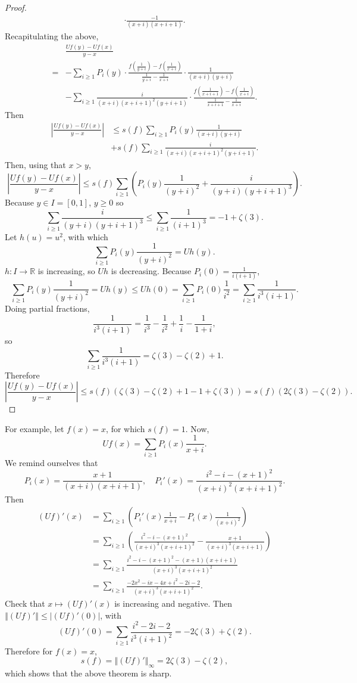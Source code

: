 \documentclass{article}
\newcommand{\norm}[1]{\left\Vert #1 \right\Vert}
\theoremstyle{definition}
\begin{document}
\begin{proof}
\[\begin{split}
\cdot \frac{-1}{(x+i)(x+i+1)}.
\end{split}
\]
Recapitulating the above,
\[
\begin{split}
&\frac{Uf(y)-Uf(x)}{y-x}\\
=&-\sum_{i \geq 1} P_i(y) \cdot \frac{f\left(\frac{1}{y+i}\right) - f\left(\frac{1}{x+i} \right)}{\frac{1}{y+i}-\frac{1}{x+i}}
\cdot \frac{1}{(x+i)(y+i)}\\
&-\sum_{i \geq 1} \frac{i}{(x+i)(x+i+1)^2 (y+i+1)} \cdot \frac{ f \left(\frac{1}{x+i+1}\right) - f \left( \frac{1}{x+i} \right)}{\frac{1}{x+i+1}-\frac{1}{x+i}}.
\end{split}
\]
Then
\begin{align*}
\left| \frac{Uf(y)-Uf(x)}{y-x} \right|&\leq s(f) \sum_{i \geq 1} P_i(y) \frac{1}{(x+i)(y+i)}\\
&+s(f) \sum_{i \geq 1}  \frac{i}{(x+i)(x+i+1)^2 (y+i+1)}.
\end{align*}
Then, using that $x>y$,
\[
\left| \frac{Uf(y)-Uf(x)}{y-x} \right| \leq s(f) \sum_{i \geq 1} \left( P_i(y) \frac{1}{(y+i)^2} + \frac{i}{(y+i)(y+i+1)^3} \right).
\]
Because $y \in I = [0,1]$, $y \geq 0$ so 
\[
\sum_{i \geq 1} \frac{i}{(y+i)(y+i+1)^3} \leq \sum_{i \geq 1} \frac{1}{(i+1)^3} = -1+\zeta(3).
\]
Let $h(u) = u^2$, with which
\[
\sum_{i \geq 1} P_i(y) \frac{1}{(y+i)^2} = Uh(y).
\]
$h:I \to \mathbb{R}$ is increasing, so $Uh$ is decreasing. 
Because $P_i(0) = \frac{1}{i(i+1)}$,
\[
\sum_{i \geq 1} P_i(y) \frac{1}{(y+i)^2} = Uh(y) \leq Uh(0) = \sum_{i \geq 1} P_i(0) \frac{1}{i^2}
=\sum_{i \geq 1} \frac{1}{i^3(i+1)}.
\]
Doing partial fractions, 
\[
\frac{1}{i^3(i+1)} = \frac{1}{i^3} - \frac{1}{i^2} + \frac{1}{i} - \frac{1}{1+i},
\]
so
\[
\sum_{i \geq 1} \frac{1}{i^3(i+1)} = \zeta(3) - \zeta(2) + 1.
\]
Therefore
\[
\left| \frac{Uf(y)-Uf(x)}{y-x} \right| \leq s(f)  \left(  \zeta(3) - \zeta(2) + 1 - 1 + \zeta(3) \right)
=s(f) (2\zeta(3)-\zeta(2)).
\]
\end{proof}

For example, let 
$f(x)=x$, for which $s(f)=1$. Now,
\[
Uf(x) = \sum_{i \geq 1} P_i(x) \frac{1}{x+i}.
\]
We remind ourselves that
\[
P_i(x) = \frac{x+1}{(x+i)(x+i+1)},\quad P_i'(x) =  \frac{i^2-i-(x+1)^2}{(x+i)^2(x+i+1)^2}.
\]
Then
\begin{align*}
(Uf)'(x)&=\sum_{i \geq 1} \left( P_i'(x) \frac{1}{x+i} - P_i(x) \frac{1}{(x+i)^2} \right)\\
&=\sum_{i \geq 1} \left( \frac{i^2-i-(x+1)^2}{(x+i)^3(x+i+1)^2} - \frac{x+1}{(x+i)^3(x+i+1)}\right)\\
&=\sum_{i \geq 1} \frac{i^2-i-(x+1)^2-(x+1)(x+i+1)}{(x+i)^3(x+i+1)^2}\\
&=\sum_{i \geq 1} \frac{-2x^2-ix-4x+i^2-2i-2}{(x+i)^3(x+i+1)^2}.
\end{align*}
Check that $x \mapsto (Uf)'(x)$ is increasing and negative. Then
$\norm{(Uf)'} \leq |(Uf)'(0)|$, with
\[
(Uf)'(0) = \sum_{i \geq 1} \frac{i^2-2i-2}{i^3(i+1)^2} = -2\zeta(3) + \zeta(2).
\]
Therefore for $f(x)=x$,
\[
s(f) = \norm{(Uf)'}_\infty = 2 \zeta(3)-\zeta(2),
\]
which shows that the above theorem is sharp.
\end{document}
